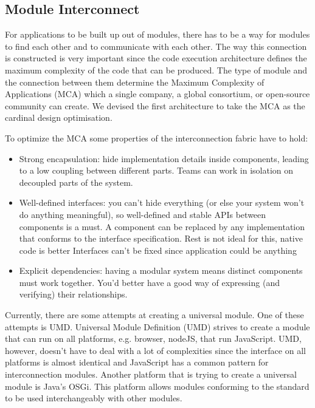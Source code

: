 \subsection*{Module Interconnect}


For applications to be built up out of modules, there has to be a way for modules to find each other and to communicate with each other. The way this connection is constructed is very important since the code execution architecture defines the maximum complexity of the code that can be produced. The type of module and the connection between them determine the Maximum Complexity of Applications (MCA) which a single company, a global consortium, or open-source community can create. We devised the first architecture to take the MCA as the cardinal design optimisation. 


To optimize the MCA some properties of the interconnection fabric have to hold:
\begin{itemize}
	\item Strong encapsulation: hide implementation details inside components, leading to a low coupling between different parts. Teams can work in isolation on decoupled parts of the system.
	\item Well-defined interfaces: you can’t hide everything (or else your system won’t do anything meaningful), so well-defined and stable APIs between components is a must. A component can be replaced by any implementation that conforms to the interface specification. Rest is not ideal for this, native code is better Interfaces can't be fixed since application could be anything
	\item Explicit dependencies: having a modular system means distinct components must work together. You’d better have a good way of expressing (and verifying) their relationships.
\end{itemize}

Currently, there are some attempts at creating a universal module. One of these attempts is UMD. Universal Module Definition (UMD) strives to create a module that can run on all platforms, e.g. browser, nodeJS, that run JavaScript. UMD, however, doesn't have to deal with a lot of complexities since the interface on all platforms is almost identical and JavaScript has a common pattern for interconnection modules. Another platform that is trying to create a universal module is Java's OSGi. This platform allows modules conforming to the standard to be used interchangeably with other modules. 

